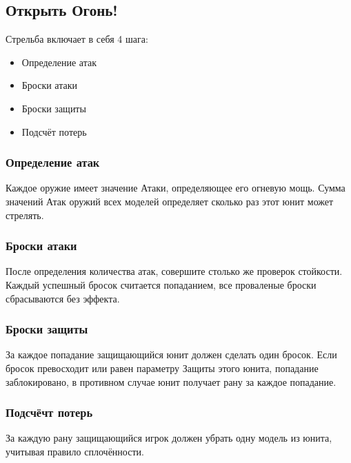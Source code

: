 \documentclass[twocolumn]{article}
\begin{document}
\subsection{Открыть Огонь!}
Стрельба включает в себя 4 шага:
\begin{itemize}
    \item Определение атак
    \item Броски атаки
    \item Броски защиты
    \item Подсчёт потерь
\end{itemize}

\subsubsection{Определение атак}
Каждое оружие имеет значение Атаки, определяющее его огневую мощь. 
Сумма значений Атак оружий всех моделей определяет сколько раз этот юнит может стрелять.
\subsubsection{Броски атаки}
После определения количества атак, совершите столько же проверок стойкости.
Каждый успешный бросок считается попаданием, все проваленые броски сбрасываются без эффекта.
\subsubsection{Броски защиты}
За каждое попадание защищающийся юнит должен сделать один бросок. Если бросок превосходит или равен параметру Защиты этого юнита, попадание заблокировано, в противном случае юнит получает рану за каждое попадание.
\subsubsection{Подсчёчт потерь}
За каждую рану защищающийся игрок должен убрать одну модель из юнита, учитывая правило сплочённости.
\end{document}
